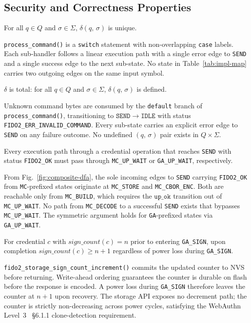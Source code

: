 \subsection{Security and Correctness Properties}
\label{sec:formal:props}

\begin{proposition}[Determinism]
\label{prop:determinism}
For all $q \in Q$ and $\sigma \in \Sigma$,
$\delta(q,\,\sigma)$ is unique.
\end{proposition}
\IEEEproof
\texttt{process\_command()} is a \texttt{switch} statement
with non-overlapping \texttt{case} labels.
Each sub-handler follows a linear execution path with a
single error edge to \texttt{SEND} and a single success
edge to the next sub-state.
No state in Table~\ref{tab:impl-map} carries two outgoing
edges on the same input symbol.
\IEEEQED

\begin{proposition}[Completeness]
\label{prop:completeness}
$\delta$ is total: for all $q \in Q$ and
$\sigma \in \Sigma$, $\delta(q,\,\sigma)$ is defined.
\end{proposition}
\IEEEproof
Unknown command bytes are consumed by the \texttt{default}
branch of \texttt{process\_command()}, transitioning to
$\mathtt{SEND} \to \mathtt{IDLE}$ with status
\texttt{FIDO2\_ERR\_INVALID\_COMMAND}.
Every sub-state carries an explicit error edge to
\texttt{SEND} on any failure outcome.
No undefined $(q,\,\sigma)$ pair exists in
$Q \times \Sigma$.
\IEEEQED

\begin{proposition}
\label{prop:up}
Every execution path through a credential operation
that reaches \texttt{SEND} with status \texttt{FIDO2\_OK}
must pass through \texttt{MC\_UP\_WAIT} or
\texttt{GA\_UP\_WAIT}, respectively.
\end{proposition}
\IEEEproof
From Fig.~\ref{fig:composite-dfa}, the sole incoming edges
to \texttt{SEND} carrying \texttt{FIDO2\_OK} from
\texttt{MC}-prefixed states originate at \texttt{MC\_STORE}
and \texttt{MC\_CBOR\_ENC}.
Both are reachable only from \texttt{MC\_BUILD}, which
requires the $\mathtt{up\_ok}$ transition out of
\texttt{MC\_UP\_WAIT}.
No path from \texttt{MC\_DECODE} to a successful
\texttt{SEND} exists that bypasses \texttt{MC\_UP\_WAIT}.
The symmetric argument holds for \texttt{GA}-prefixed
states via \texttt{GA\_UP\_WAIT}.
\IEEEQED

\begin{proposition}
\label{prop:counter}
For credential $c$ with $\mathit{sign\_count}(c) = n$
prior to entering \texttt{GA\_SIGN}, upon completion
$\mathit{sign\_count}(c) \geq n + 1$ regardless of
power loss during \texttt{GA\_SIGN}.
\end{proposition}
\IEEEproof
\texttt{fido2\_storage\_sign\_count\_increment()} commits
the updated counter to NVS before returning.
Write-ahead ordering guarantees the counter is durable on
flash before the response is encoded.
A power loss during \texttt{GA\_SIGN} therefore leaves the
counter at $n+1$ upon recovery.
The storage API exposes no decrement path; the counter is
strictly non-decreasing across power cycles, satisfying the
WebAuthn Level~3~\cite{webauthn-l3} \S6.1.1
clone-detection requirement.
\IEEEQED

